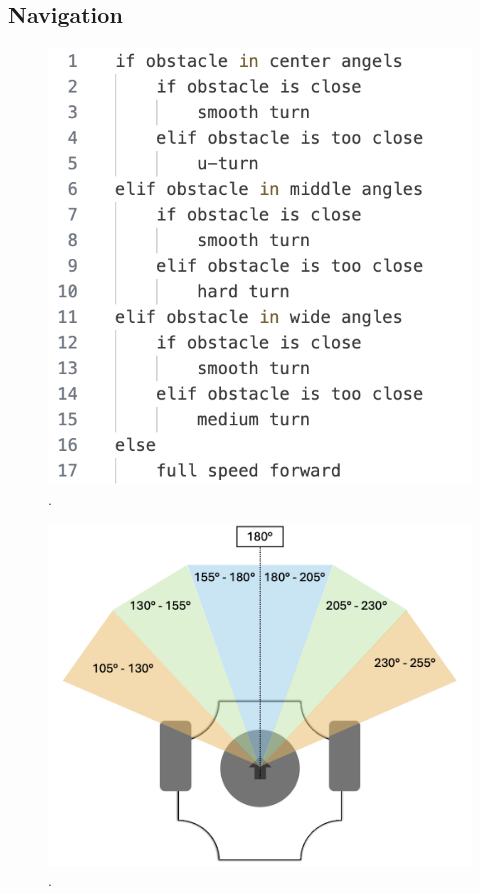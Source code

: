 \documentclass[conference]{IEEEtran}
\begin{document}
\subsection{Navigation}
\begin{figure}[htbp]
    \centerline{\includegraphics[width=0.6\columnwidth\hspace{-1.3cm}]{Pictures/Pseudo.png}}
    \caption{.}
    \label{sec:pseudo}
    \end{figure}
\begin{figure}[htbp]
    \centerline{\includegraphics[width=0.9\columnwidth]{Pictures/LiDAR Angels.png}}
    \caption{.}
    \label{sec:angles}
    \end{figure}
\end{document}
